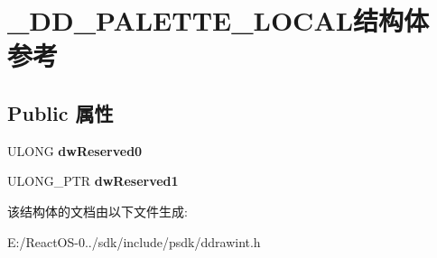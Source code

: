 \hypertarget{struct___d_d___p_a_l_e_t_t_e___l_o_c_a_l}{}\section{\+\_\+\+D\+D\+\_\+\+P\+A\+L\+E\+T\+T\+E\+\_\+\+L\+O\+C\+A\+L结构体 参考}
\label{struct___d_d___p_a_l_e_t_t_e___l_o_c_a_l}
\subsection*{Public 属性}
\begin{DoxyCompactItemize}
\item 
\mbox{\label{struct___d_d___p_a_l_e_t_t_e___l_o_c_a_l_a7f83458b6a18ac88501a6ff07ae615aa}} 
U\+L\+O\+NG {\bfseries dw\+Reserved0}
\item 
\mbox{\label{struct___d_d___p_a_l_e_t_t_e___l_o_c_a_l_a839d7bd20584b12fccd3ca02dc7c8764}} 
U\+L\+O\+N\+G\+\_\+\+P\+TR {\bfseries dw\+Reserved1}
\end{DoxyCompactItemize}


该结构体的文档由以下文件生成\+:\begin{DoxyCompactItemize}
\item 
E\+:/\+React\+O\+S-\/0../sdk/include/psdk/ddrawint.\+h\end{DoxyCompactItemize}
